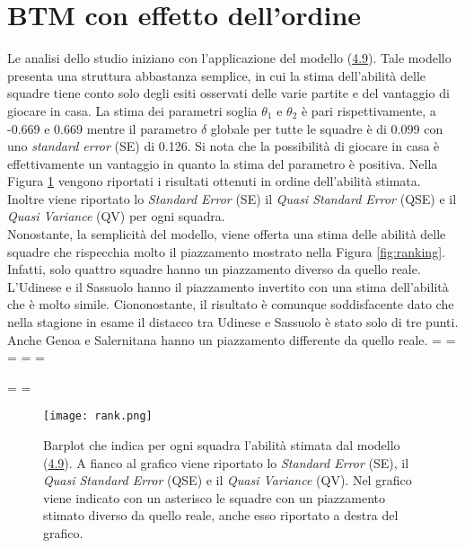 \section {BTM con effetto dell'ordine}
Le analisi dello studio iniziano con l'applicazione del modello (\hyperref[for:3.9]{4.9}). Tale modello presenta una struttura abbastanza semplice, in cui la stima dell'abilità delle squadre tiene conto solo degli esiti osservati delle varie partite e del vantaggio di giocare in casa. 
La stima dei parametri soglia $\theta_1$ e $\theta_2$ è pari rispettivamente, a -0.669 e 0.669 mentre il parametro $\delta$ globale per tutte le squadre è di 0.099 con uno \emph{standard error} (SE) di 0.126. Si nota che la possibilità di giocare in casa è effettivamente un vantaggio in quanto la stima del parametro è positiva. Nella Figura \ref{tab:BTH} vengono riportati i risultati ottenuti in ordine dell'abilità stimata. Inoltre viene riportato lo \emph{Standard Error} (SE) il \emph{Quasi Standard Error} (QSE) \autocite{firth2004quasi} e il \emph{Quasi Variance} (QV)\autocite{firth2004quasi} per ogni squadra.\\
Nonostante, la semplicità del modello, viene offerta una stima delle abilità delle squadre che rispecchia molto il piazzamento mostrato nella Figura \ref{fig:ranking}. Infatti, solo quattro squadre hanno un piazzamento diverso da quello reale. L'Udinese e il Sassuolo hanno il piazzamento invertito con una stima dell'abilità che è molto simile. Ciononostante, il risultato è comunque soddisfacente dato che nella stagione in esame il distacco tra Udinese e Sassuolo è stato solo di tre punti. Anche Genoa e Salernitana hanno un piazzamento differente da quello reale.
\newpage
\paperwidth=\pdfpageheight
\paperheight=\pdfpagewidth
\pdfpageheight=\paperheight
\pdfpagewidth=\paperwidth
\headwidth=\textheight

\begingroup 
\vsize=\textwidth
\hsize=\textheight


\pagestyle{empty}
\begin{figure}[htbp]
	\begin{center}
		\texttt{[image: rank.png]}
		\caption{Barplot che indica per ogni squadra l'abilità stimata dal modello (\hyperref[for:3.9]{4.9}). A fianco al grafico viene riportato lo \emph{Standard Error} (SE), il \emph{Quasi Standard Error} (QSE) e il \emph{Quasi Variance} (QV). Nel grafico viene indicato con un asterisco le squadre con un piazzamento stimato diverso da quello reale, anche esso riportato a destra del grafico.} \label{tab:BTH}
	\end{center}
\end{figure}

